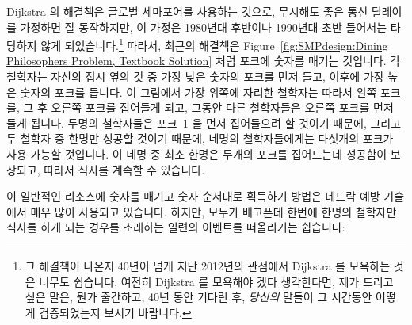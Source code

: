 Dijkstra 의 해결책은 글로벌 세마포어를 사용하는 것으로, 무시해도 좋은 통신
딜레이를 가정하면 잘 동작하지만, 이 가정은 1980년대 후반이나 1990년대 초반
들어서는 타당하지 않게 되었습니다.\footnote{
	그 해결책이 나온지 40년이 넘게 지난 2012년의 관점에서 Dijkstra 를
	모욕하는 것은 너무도 쉽습니다.
	여전히 Dijkstra 를 모욕해야 겠다 생각한다면, 제가 드리고 싶은 말은,
	뭔가 출간하고, 40년 동안 기다린 후, \emph{당신의} 말들이 그 시간동안
	어떻게 검증되었는지 보시기 바랍니다.}
따라서, 최근의 해결책은 
Figure~\ref{fig:SMPdesign:Dining Philosophers Problem, Textbook Solution} 처럼
포크에 숫자를 매기는 것입니다.
각 철학자는 자신의 접시 옆의 것 중 가장 낮은 숫자의 포크를 먼저 들고, 이후에
가장 높은 숫자의 포크를 듭니다.
이 그림에서 가장 위쪽에 자리한 철학자는 따라서 왼쪽 포크를, 그 후 오른쪽 포크를
집어들게 되고, 그동안 다른 철학자들은 오른쪽 포크를 먼저 들게 됩니다.
두명의 철학자들은 포크~1 을 먼저 집어들으려 할 것이기 때문에, 그리고 두 철학자
중 한명만 성공할 것이기 때문에, 네명의 철학자들에게는 다섯개의 포크가 사용
가능할 것입니다.
이 네명 중 최소 한명은 두개의 포크를 집어드는데 성공함이 보장되고, 따라서
식사를 계속할 수 있습니다.

이 일반적인 리소스에 숫자를 매기고 숫자 순서대로 획득하기 방법은 데드락 예방
기술에서 매우 많이 사용되고 있습니다.
하지만, 모두가 배고픈데 한번에 한명의 철학자만 식사를 하게 되는 경우를 초래하는
일련의 이벤트를 떠올리기는 쉽습니다:

